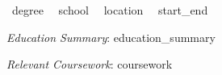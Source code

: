 

\begin{cventries}

  \cventry
    { {{~degree~}} } %
    { {{~school~}} } %
    { {{~location~}} } %
    { {{~start_end~}} } %
    {
      \begin{cvitems} %
        \item {\textit{Education Summary}: {{{education_summary}}} }
        \item {\textit{Relevant Coursework}: {{{coursework}}} }
      \end{cvitems}
    }
\end{cventries}